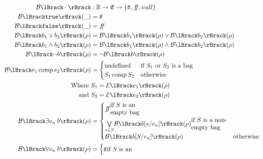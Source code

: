 \begin{align}
    \boolsem{\cdot} &: \mathbb{B} \rightarrow \environments \rightarrow \{\true, \false, \mnull\} \\
    \boolsem{\texttt{true}}(\_) &= \true \\
    \boolsem{\texttt{false}}(\_) &= \false \\
    \boolsem{b_1 \lor b_2}(\environment) &= \boolsem{b_1}(\environment) \lor \boolsem{b_2}(\environment) \\
    \boolsem{b_1 \land b_2}(\environment) &= \boolsem{b_1}(\environment) \land \boolsem{b_2}(\environment) \\
    \boolsem{\neg b}(\environment) &= \neg \boolsem{b}(\environment) \\
    \boolsem{e_1 \compareoperator e_2}(\environment) &=
    \begin{cases}
        \text{undefined} & \text{if } S_1 \text{ or } S_2 \text{ is a bag} \\
        S_1 \compareoperator S_2 & \text{otherwise }
    \end{cases} \\
    \text{Where }& S_1 = \expsem{e_1}(\environment) \\
    \text{and }& S_2 = \expsem{e_2}(\environment) \\
    \boolsem{\exists v_n \; b}(\environment) &= \begin{cases}
        \false  \begin{split}
                    & \text{if $S$ is an} \\
                    & \text{empty bag}
        \end{split} \\
        \underset{s \in S}{\bigvee}\boolsem{b[s/v_n]}(\environment) \begin{split}
                                                                        & \text{if $S$ is a non-} \\
                                                                        & \text{empty bag}
        \end{split} \\
        \boolsem{b[S/v_n]}(\environment) & \text{otherwise} \\
    \end{cases} \\
    \boolsem{\forall v_n \; b}(\environment) &= \begin{cases}
        \true \begin{split}
                  & \text{if $S$ is an} \\

\end{split}
\end{cases}
\end{align}
